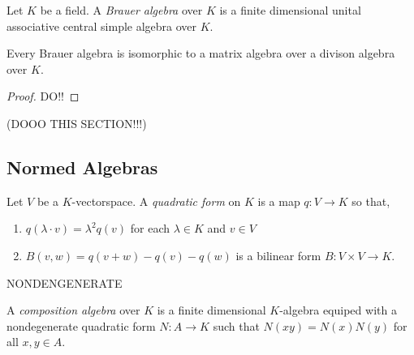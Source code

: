\documentclass[12pt]{extarticle}
\begin{document}
\begin{defn}
Let $K$ be a field. A \textit{Brauer algebra} over $K$ is a finite dimensional unital associative central simple algebra over $K$.
\end{defn}

\begin{prop}
Every Brauer algebra is isomorphic to a matrix algebra over a divison algebra over $K$.
\end{prop}

\begin{proof}
DO!!
\end{proof}

(DOOO THIS SECTION!!!)


\subsection{Normed Algebras}

\begin{defn}
Let $V$ be a $K$-vectorspace. A \textit{quadratic form} on $K$ is a map $q : V \to K$ so that,
\begin{enumerate}
\item $q(\lambda \cdot v) = \lambda^2 q(v)$ for each $\lambda \in K$ and $v \in V$
\item $B(v, w) = q(v + w) - q(v) - q(w)$ is a bilinear form $B : V \times V \to K$.
\end{enumerate}
\end{defn}

NONDENGENERATE

\begin{defn}
A \textit{composition algebra} over $K$ is a finite dimensional $K$-algebra equiped with a nondegenerate quadratic form $N : A \to K$ such that $N(xy) = N(x) N(y)$ for all $x,y \in A$.
\end{defn}

\begin{theorem}

\end{theorem}
\end{document}
